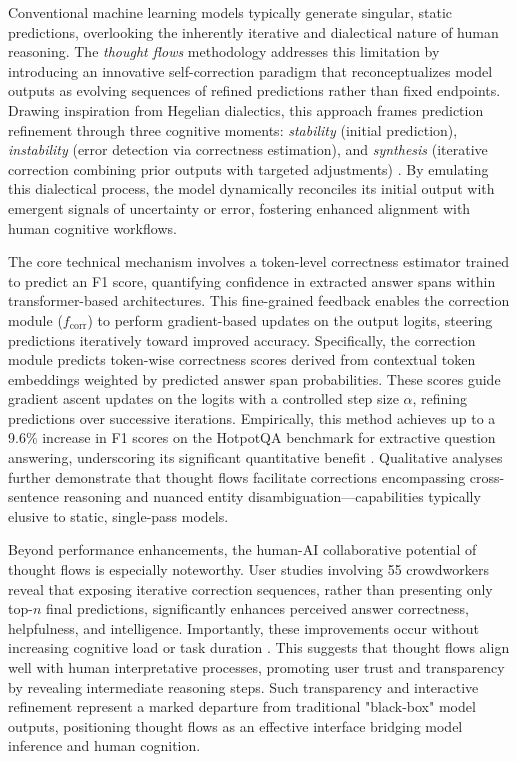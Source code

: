 \documentclass[sigconf]{acmart}
\begin{document}
Conventional machine learning models typically generate singular, static predictions, overlooking the inherently iterative and dialectical nature of human reasoning. The \emph{thought flows} methodology addresses this limitation by introducing an innovative self-correction paradigm that reconceptualizes model outputs as evolving sequences of refined predictions rather than fixed endpoints. Drawing inspiration from Hegelian dialectics, this approach frames prediction refinement through three cognitive moments: \textit{stability} (initial prediction), \textit{instability} (error detection via correctness estimation), and \textit{synthesis} (iterative correction combining prior outputs with targeted adjustments) \cite{ref43}. By emulating this dialectical process, the model dynamically reconciles its initial output with emergent signals of uncertainty or error, fostering enhanced alignment with human cognitive workflows.

The core technical mechanism involves a token-level correctness estimator trained to predict an F1 score, quantifying confidence in extracted answer spans within transformer-based architectures. This fine-grained feedback enables the correction module ($f_{\text{corr}}$) to perform gradient-based updates on the output logits, steering predictions iteratively toward improved accuracy. Specifically, the correction module predicts token-wise correctness scores derived from contextual token embeddings weighted by predicted answer span probabilities. These scores guide gradient ascent updates on the logits with a controlled step size $\alpha$, refining predictions over successive iterations. Empirically, this method achieves up to a 9.6\% increase in F1 scores on the HotpotQA benchmark for extractive question answering, underscoring its significant quantitative benefit \cite{ref43}. Qualitative analyses further demonstrate that thought flows facilitate corrections encompassing cross-sentence reasoning and nuanced entity disambiguation—capabilities typically elusive to static, single-pass models.

Beyond performance enhancements, the human-AI collaborative potential of thought flows is especially noteworthy. User studies involving 55 crowdworkers reveal that exposing iterative correction sequences, rather than presenting only top-$n$ final predictions, significantly enhances perceived answer correctness, helpfulness, and intelligence. Importantly, these improvements occur without increasing cognitive load or task duration \cite{ref43}. This suggests that thought flows align well with human interpretative processes, promoting user trust and transparency by revealing intermediate reasoning steps. Such transparency and interactive refinement represent a marked departure from traditional "black-box" model outputs, positioning thought flows as an effective interface bridging model inference and human cognition.
\end{document}
